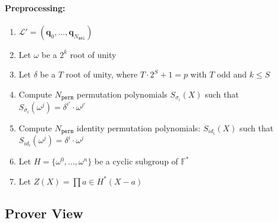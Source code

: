 \paragraph{Preprocessing:}


\begin{algorithm}[h]
    \begin{enumerate}
        \item $\mathcal{L}' = (\textbf{q}_{0}, ..., \textbf{q}_{N_{\texttt{sel}}})$
        \item Let $\omega$ be a $2^k$ root of unity
        \item Let $\delta$ be a $T$ root of unity, where $T \cdot 2^S + 1 = p$ with $T$ odd and $k \leq S$
        \item Compute $N_{\texttt{perm}}$ permutation polynomials $S_{\sigma_i}(X)$ such that $S_{\sigma_i}(\omega^j) = \delta^{i'} \cdot \omega^{j'}$
        \item Compute $N_{\texttt{perm}}$ identity permutation polynomials: $S_{id_i}(X)$ such that $S_{id_i}(\omega^j) = \delta^i \cdot \omega^j$
        \item Let $H = \{\omega^0, ..., \omega^n\}$ be a cyclic subgroup of $\mathbb{F}^*$
        \item Let $Z(X) = \prod\limits{a \in H^*}(X - a)$
    \end{enumerate}
\end{algorithm}

\subsection{Prover View}

